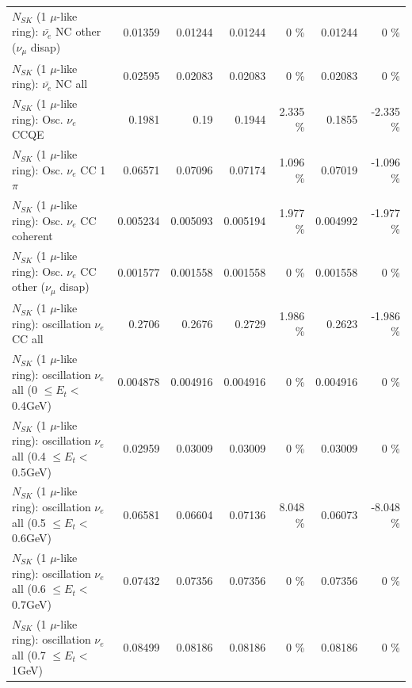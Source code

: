 \begin{table}
\begin{tabular}{| l | r | r | r  r | r  r |}
          $N_{SK}$ (1 $\mu$-like ring): $\bar{\nu_e}$ NC other ($\nu_\mu$ disap) &         0.01359 &         0.01244 &         0.01244 &        0 \%  &         0.01244 &        0 \%  \\ 
                            $N_{SK}$ (1 $\mu$-like ring): $\bar{\nu_{e}}$ NC all &         0.02595 &         0.02083 &         0.02083 &        0 \%  &         0.02083 &        0 \%  \\ 
\hline
\hline
\hline
                                 $N_{SK}$ (1 $\mu$-like ring): Osc. $\nu_e$ CCQE &          0.1981 &            0.19 &          0.1944 &    2.335 \%  &          0.1855 &   -2.335 \%  \\ 
                            $N_{SK}$ (1 $\mu$-like ring): Osc. $\nu_e$ CC 1$\pi$ &         0.06571 &         0.07096 &         0.07174 &    1.096 \%  &         0.07019 &   -1.096 \%  \\ 
                          $N_{SK}$ (1 $\mu$-like ring): Osc. $\nu_e$ CC coherent &        0.005234 &        0.005093 &        0.005194 &    1.977 \%  &        0.004992 &   -1.977 \%  \\ 
           $N_{SK}$ (1 $\mu$-like ring): Osc. $\nu_e$ CC other ($\nu_\mu$ disap) &        0.001577 &        0.001558 &        0.001558 &        0 \%  &        0.001558 &        0 \%  \\ 
                        $N_{SK}$ (1 $\mu$-like ring): oscillation $\nu_e$ CC all &          0.2706 &          0.2676 &          0.2729 &    1.986 \%  &          0.2623 &   -1.986 \%  \\ 
\hline
$N_{SK}$ (1 $\mu$-like ring): oscillation $\nu_{e}$ all (0 $\leq E_{t} <$ 0.4GeV) &        0.004878 &        0.004916 &        0.004916 &        0 \%  &        0.004916 &        0 \%  \\ 
$N_{SK}$ (1 $\mu$-like ring): oscillation $\nu_{e}$ all (0.4 $\leq E_{t} <$ 0.5GeV) &         0.02959 &         0.03009 &         0.03009 &        0 \%  &         0.03009 &        0 \%  \\ 
$N_{SK}$ (1 $\mu$-like ring): oscillation $\nu_{e}$ all (0.5 $\leq E_{t} <$ 0.6GeV) &         0.06581 &         0.06604 &         0.07136 &    8.048 \%  &         0.06073 &   -8.048 \%  \\ 
$N_{SK}$ (1 $\mu$-like ring): oscillation $\nu_{e}$ all (0.6 $\leq E_{t} <$ 0.7GeV) &         0.07432 &         0.07356 &         0.07356 &        0 \%  &         0.07356 &        0 \%  \\ 
$N_{SK}$ (1 $\mu$-like ring): oscillation $\nu_{e}$ all (0.7 $\leq E_{t} <$ 1GeV) &         0.08499 &         0.08186 &         0.08186 &        0 \%  &         0.08186 &        0 \%  \\ 

\end{tabular}
\end{table}
